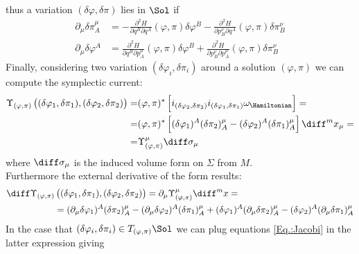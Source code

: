 \documentclass[a4paper,12pt,fleqn]{scrartcl}  %
\begin{document}
thus a variation $(\delta \varphi, \delta \pi)$ lies in $\Sol$ if
\begin{align}\label{Eq.:Jacobi}
	\partial_\mu \delta \pi^\mu_A &=
	- \frac{\partial^2 H}{\partial q^B \partial q^A} (\varphi, \pi) \delta \varphi^B
	- \frac{\partial^2 H}{\partial p^\nu_B \partial q^A} (\varphi, \pi) \delta \pi^\nu_B \\
		\partial_\mu \delta \varphi^A &=
		\frac{\partial^2 H}{\partial q^B \partial p^\mu_A} (\varphi, \pi) \delta \varphi^B +
		\frac{\partial^2 H}{\partial p^\nu_B \partial p^\mu_A}(\varphi, \pi) \delta \pi^\nu_B
\end{align}
%
Finally, considering two variation $(\delta \varphi_i, \delta \pi_i)$ around a solution $(\varphi,\pi)$ we can compute the symplectic current:
\begin{align*}
	\Upsilon_{(\varphi,\pi)} \left( (\delta \varphi_1, \delta \pi_1) , (\delta \varphi_2, \delta \pi_2) \right) = &
	(\varphi, \pi)^\ast \left[ i_{( \delta \varphi_2, \delta \pi_2)} i_{( \delta \varphi_1, \delta \pi_1)} \omega_\Hamiltonian \right] = \\
	= & (\varphi, \pi)^\ast	\left[ (\delta \varphi_1)^A (\delta \pi_2)^\mu_A - (\delta \varphi_2)^A (\delta \pi_1)^\mu_A \right]	\diff^m x_\mu = \\
	= & \Upsilon_{(\varphi,\pi)}^\mu \diff \sigma_\mu
\end{align*}
where $\diff \sigma_\mu $ is the induced volume form on $\Sigma$ from $M$.\\
Furthermore the external derivative of the form results:
\begin{align*}
	\diff \Upsilon_{(\varphi,\pi)} &\left( (\delta \varphi_1, \delta \pi_1) , (\delta \varphi_2, \delta \pi_2) \right)  =
	\partial_\mu \Upsilon_{(\varphi,\pi)}^\mu \diff^mx = \\
	& = (\partial_\mu \delta \varphi_1)^A (\delta \pi_2)^\mu_A - (\partial_\mu \delta \varphi_2)^A (\delta \pi_1)^\mu_A + 
	(\delta \varphi_1)^A (\partial_\mu  \delta \pi_2)^\mu_A - (\delta \varphi_2)^A (\partial_\mu  \delta \pi_1)^\mu_A
\end{align*}
In the case that $(\delta \varphi_i, \delta \pi_i) \in T_{(\varphi,\pi)}\Sol$ we can plug equations \ref{Eq.:Jacobi} in the latter expression giving
\end{document}
